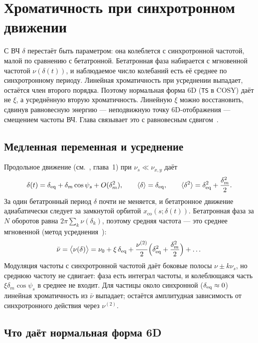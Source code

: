 \section{Хроматичность при синхротронном движении}
\label{sec:rf}

С ВЧ $\delta$ перестаёт быть параметром: она колеблется с синхротронной частотой, малой по сравнению с бетатронной. Бетатронная фаза набирается с мгновенной частотой $\nu(\delta(t))$, и наблюдаемое число колебаний есть её среднее по синхротронному периоду. Линейная хроматичность при усреднении выпадает, остаётся член второго порядка. Поэтому нормальная форма 6D (\texttt{TS} в COSY) даёт не $\xi$, а усреднённую вторую хроматичность. Линейную $\xi$ можно восстановить, сдвинув равновесную энергию --- неподвижную точку 6D-отображения --- смещением частоты ВЧ. Глава связывает это с равновесным сдвигом~\cite{EqNote}.

\subsection{Медленная переменная и усреднение}

Продольное движение (см.~\cite{EqNote}, глава~1) при $\nu_s\ll\nu_{x,y}$ даёт
\begin{equation}
\label{eq:delta-t}
\delta(t)=\delta_{\mathrm{eq}}+\delta_m\cos\psi_s+O(\delta_m^2),
\qquad
\langle\delta\rangle=\delta_{\mathrm{eq}},
\qquad
\langle\delta^2\rangle=\delta_{\mathrm{eq}}^2+\frac{\delta_m^2}{2}.
\end{equation}
За один бетатронный период $\delta$ почти не меняется, и бетатронное движение адиабатически следует за замкнутой орбитой $x_{\mathrm{co}}(s;\delta(t))$. Бетатронная фаза за $N$ оборотов равна $2\pi\sum_k\nu(\delta_k)$, поэтому средняя частота --- это среднее мгновенной (метод усреднения~\cite{Bogoliubov1961}):
\begin{equation}
\label{eq:nu-avg}
\bar\nu=\bigl\langle\nu(\delta)\bigr\rangle
=\nu_0+\xi\,\delta_{\mathrm{eq}}+\frac{\nu^{(2)}}{2}\Bigl(\delta_{\mathrm{eq}}^2+\frac{\delta_m^2}{2}\Bigr)+\dots
\end{equation}
Модуляция частоты с синхротронной частотой даёт боковые полосы $\nu\pm k\nu_s$, но среднюю частоту не сдвигает: фаза есть интеграл частоты, и колеблющаяся часть $\xi\delta_m\cos\psi_s$ в среднее не входит. Для частицы около синхронной ($\delta_{\mathrm{eq}}\approx0$) линейная хроматичность из $\bar\nu$ выпадает; остаётся амплитудная зависимость от синхротронного действия через $\nu^{(2)}$.

\subsection{Что даёт нормальная форма 6D}

